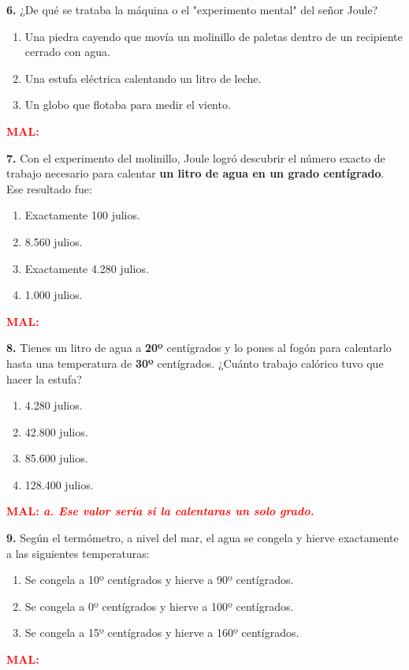 \documentclass[12pt, letterpaper]{article}
\newif\ifshowanswers
\newcommand{\retroalimentacion}[3]{
	\ifshowanswers
	\vspace{0.2cm}
	\noindent\textcolor{gray}{\rule{\textwidth}{2pt}} %
	\par\vspace{0.1cm}
	\noindent \textbf{\textcolor{blue}{BIEN: #1 \quad \textit{(#2)}}}
	
	\if\relax\detokenize{#3}\relax
	\else
	\par\vspace{0.1cm}
	\noindent \textbf{\textcolor{red}{MAL: \textit{#3}}}
	\fi
	\vspace{0.6cm}
	\else
	\vspace{1.2cm} %
	\fi
}
\begin{document}
	\noindent \textbf{6.} ¿De qué se trataba la máquina o el "experimento mental" del señor Joule?
	\begin{enumerate}[label=\alph*)]
		\item Una piedra cayendo que movía un molinillo de paletas dentro de un recipiente cerrado con agua.
		\item Una estufa eléctrica calentando un litro de leche.
		\item Un globo que flotaba para medir el viento.
	\end{enumerate}
	\retroalimentacion{a}{La piedra al caer movía las paletas. El rozamiento agitaba el agua y la energía del movimiento se transformaba en calor.}{}
	
	\noindent \textbf{7.} Con el experimento del molinillo, Joule logró descubrir el número exacto de trabajo necesario para calentar \textbf{un litro de agua en un grado centígrado}. Ese resultado fue:
	\begin{enumerate}[label=\alph*)]
		\item Exactamente 100 julios.
		\item 8.560 julios.
		\item Exactamente 4.280 julios.
		\item 1.000 julios.
	\end{enumerate}
	\retroalimentacion{c}{Ese es el valor exacto. Joule calculó que se necesitan exactamente 4.280 julios de trabajo para subir un grado a un litro de agua.}{}
	
	\noindent \textbf{8.} Tienes un litro de agua a \textbf{20º} centígrados y lo pones al fogón para calentarlo hasta una temperatura de \textbf{30º} centígrados. ¿Cuánto trabajo calórico tuvo que hacer la estufa?
	\begin{enumerate}[label=\alph*)]
		\item 4.280 julios.
		\item 42.800 julios.
		\item 85.600 julios.
		\item 128.400 julios.
	\end{enumerate}
	\retroalimentacion{b}{La temperatura subió 10 grados (de 20º a 30º). Por cada grado son 4.280 julios. 10 $\times$ 4.280 = 42.800 julios.}{a. Ese valor sería si la calentaras un solo grado.}
	
	\noindent \textbf{9.} Según el termómetro, a nivel del mar, el agua se congela y hierve exactamente a las siguientes temperaturas:
	\begin{enumerate}[label=\alph*)]
		\item Se congela a 10º centígrados y hierve a 90º centígrados.
		\item Se congela a 0º centígrados y hierve a 100º centígrados.
		\item Se congela a 15º centígrados y hierve a 160º centígrados.
	\end{enumerate}
	\retroalimentacion{b}{El agua se congela a los 0º y hierve al llegar a los 100º centígrados.}{}
	
\end{document}

